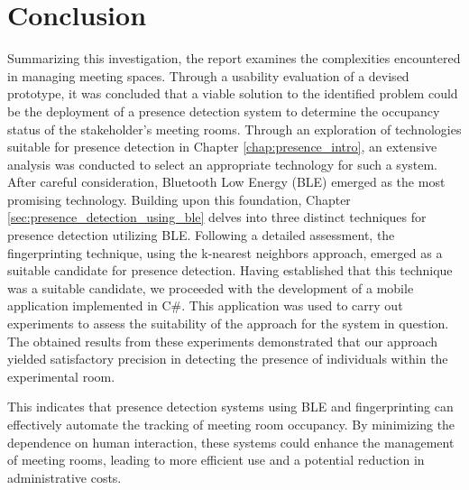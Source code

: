 \chapter{Conclusion}
Summarizing this investigation, the report examines the complexities encountered in managing meeting spaces. 
Through a usability evaluation of a devised prototype, it was concluded that a viable solution to the identified problem could be the deployment of a presence detection system to determine the occupancy status of the stakeholder's meeting rooms.
Through an exploration of technologies suitable for presence detection in Chapter \ref{chap:presence_intro}, an extensive analysis was conducted to select an appropriate technology for such a system.
After careful consideration, Bluetooth Low Energy (BLE) emerged as the most promising technology. 
Building upon this foundation, Chapter \ref{sec:presence_detection_using_ble} delves into three distinct techniques for presence detection utilizing BLE.
Following a detailed assessment, the fingerprinting technique, using the k-nearest neighbors approach, emerged as a suitable candidate for presence detection.
Having established that this technique was a suitable candidate, we proceeded with the development of a mobile application implemented in C\#. 
This application was used to carry out experiments to assess the suitability of the approach for the system in question.
The obtained results from these experiments demonstrated that our approach yielded satisfactory precision in detecting the presence of individuals within the experimental room.

This indicates that presence detection systems using BLE and fingerprinting can effectively automate the tracking of meeting room occupancy.
By minimizing the dependence on human interaction, these systems could enhance the management of meeting rooms, leading to more efficient use and a potential reduction in administrative costs.